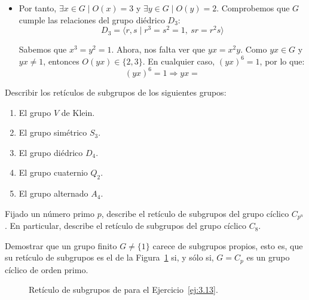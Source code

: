 \begin{ejercicio}
\begin{enumerate}
\begin{itemize}
\begin{itemize}
                \item Por tanto, $\exists x\in G\mid O(x)=3$ y $\exists y\in G\mid O(y)=2$. Comprobemos que $G$ cumple las relaciones del grupo diédrico $D_3$:
                \begin{equation*}
                    D_3 = \langle r,s\mid r^3=s^2=1,\ sr=r^2s\rangle
                \end{equation*}

                Sabemos que $x^3=y^2=1$. Ahora, nos falta ver que $yx=x^2y$. Como $yx\in G$ y $yx\neq 1$, entonces $O(yx)\in \{2,3\}$. En cualquier caso, $(yx)^6=1$, por lo que:
                \begin{equation*}
                    (yx)^6=1\Longrightarrow yx=
                \end{equation*}
            \end{itemize}

        \end{itemize}
    \end{enumerate}
\end{ejercicio}

\begin{ejercicio}\label{ej:3.11}
    Describir los retículos de subgrupos de los siguientes grupos:
    \begin{enumerate}
        \item El grupo $V$ de Klein.
        \item El grupo simétrico $S_3$.
        \item El grupo diédrico $D_4$.
        \item El grupo cuaternio $Q_2$.
        \item El grupo alternado $A_4$.
    \end{enumerate}
\end{ejercicio}

\begin{ejercicio}\label{ej:3.12}
    Fijado un número primo $p$, describe el retículo de subgrupos del grupo cíclico $C_{p^n}$. En particular, describe el retículo de subgrupos del grupo cíclico $C_8$.
\end{ejercicio}

\begin{ejercicio}\label{ej:3.13}
    Demostrar que un grupo finito $G \neq \{1\}$ carece de subgrupos propios, esto es, que su retículo de subgrupos es el de la Figura~\ref{fig:ej13} si, y sólo si, $G = C_p$ es un grupo cíclico de orden primo.
    \begin{figure}
        \centering
        \caption{Retículo de subgrupos de para el Ejercicio~\ref{ej:3.13}.}
        \label{fig:ej13}
    \end{figure}
\end{ejercicio}

